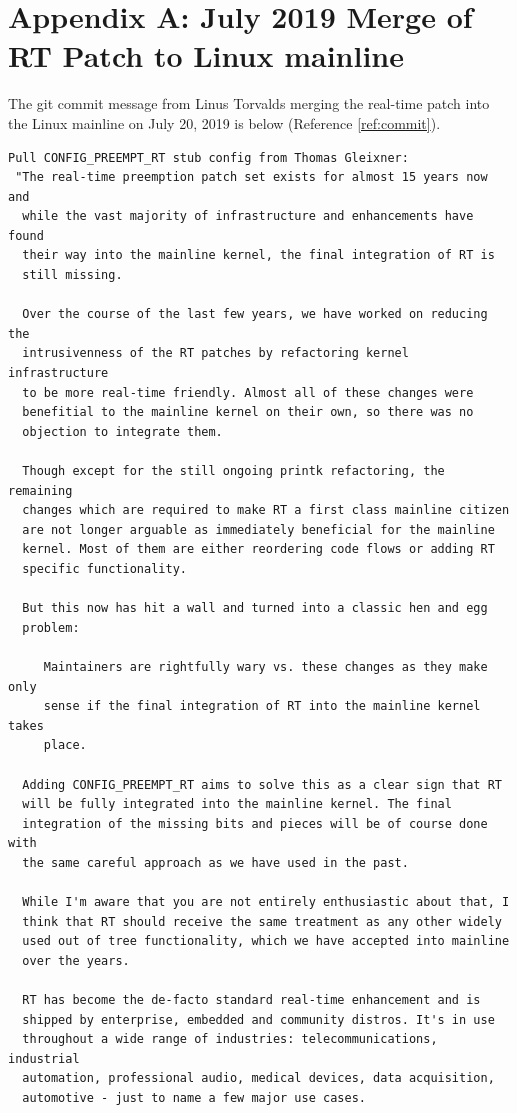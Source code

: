 \documentclass[12pt]{article}
\begin{document}
%
\newpage
\section{Appendix A: July 2019 Merge of RT Patch to Linux mainline}

The git commit message from Linus Torvalds merging the real-time patch
into the Linux mainline on July 20, 2019 is below (Reference \ref{ref:commit}).

\begin{verbatim}
Pull CONFIG_PREEMPT_RT stub config from Thomas Gleixner:
 "The real-time preemption patch set exists for almost 15 years now and
  while the vast majority of infrastructure and enhancements have found
  their way into the mainline kernel, the final integration of RT is
  still missing.

  Over the course of the last few years, we have worked on reducing the
  intrusivenness of the RT patches by refactoring kernel infrastructure
  to be more real-time friendly. Almost all of these changes were
  benefitial to the mainline kernel on their own, so there was no
  objection to integrate them.

  Though except for the still ongoing printk refactoring, the remaining
  changes which are required to make RT a first class mainline citizen
  are not longer arguable as immediately beneficial for the mainline
  kernel. Most of them are either reordering code flows or adding RT
  specific functionality.

  But this now has hit a wall and turned into a classic hen and egg
  problem:

     Maintainers are rightfully wary vs. these changes as they make only
     sense if the final integration of RT into the mainline kernel takes
     place.

  Adding CONFIG_PREEMPT_RT aims to solve this as a clear sign that RT
  will be fully integrated into the mainline kernel. The final
  integration of the missing bits and pieces will be of course done with
  the same careful approach as we have used in the past.

  While I'm aware that you are not entirely enthusiastic about that, I
  think that RT should receive the same treatment as any other widely
  used out of tree functionality, which we have accepted into mainline
  over the years.

  RT has become the de-facto standard real-time enhancement and is
  shipped by enterprise, embedded and community distros. It's in use
  throughout a wide range of industries: telecommunications, industrial
  automation, professional audio, medical devices, data acquisition,
  automotive - just to name a few major use cases.


\end{verbatim}
\end{document}
